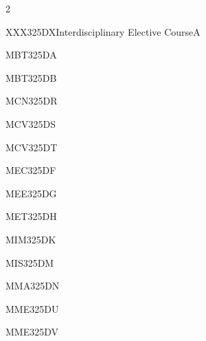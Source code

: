 \documentclass[a4paper]{syllabus}
\begin{document}
\begin{semester}{2}
	\begin{electivegroup}{XXX325DX}{Interdisciplinary Elective Course}{A}
	\begin{definecourse}{MBT325DA}
	\end{definecourse}	
	\begin{definecourse}{MBT325DB}
	\end{definecourse}
	\begin{definecourse}{MCN325DR}
	\end{definecourse}
	\begin{definecourse}{MCV325DS}
	\end{definecourse}
	\begin{definecourse}{MCV325DT}
	\end{definecourse}
	\begin{definecourse}{MEC325DF}
	\end{definecourse}
	\begin{definecourse}{MEE325DG}
	\end{definecourse}
	\begin{definecourse}{MET325DH}
	\end{definecourse}
	\begin{definecourse}{MIM325DK}
	\end{definecourse}
	\begin{definecourse}{MIS325DM}
	\end{definecourse}
	\begin{definecourse}{MMA325DN}
	\end{definecourse}
	\begin{definecourse}{MME325DU}
	\end{definecourse}
	\begin{definecourse}{MME325DV}
	\end{definecourse}
	

\end{electivegroup}
\end{semester}
\end{document}
